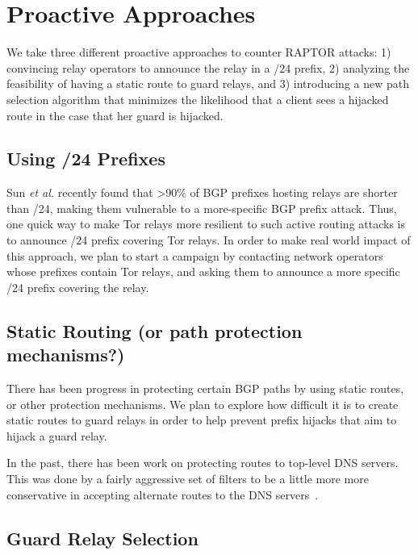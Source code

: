 \section{Proactive Approaches}
We take three different proactive approaches to counter RAPTOR attacks: 1) convincing relay operators to announce the relay in a /24 prefix, 2) analyzing the feasibility of having a static route to guard relays, and 3) introducing a new path selection algorithm that minimizes the likelihood that a client sees a hijacked route in the case that her guard is hijacked.

\subsection{Using /24 Prefixes}

Sun \emph{et al.} \cite{sun2015raptor} recently found that >90\% of BGP prefixes hosting relays are
shorter than /24, making them vulnerable to a more-specific BGP prefix attack. Thus, one quick way to make Tor relays more resilient to such active routing attacks is to announce /24 prefix covering Tor relays. In order to make real world impact of this approach, we plan to start a campaign by contacting network operators whose prefixes contain Tor relays, and asking them to announce a more specific /24 prefix covering the relay. 

\subsection{Static Routing (or path protection mechanisms?)}

There has been progress in protecting certain BGP paths by using static routes, or other protection mechanisms.  We plan to explore how difficult it is to create static routes to guard relays in order to help prevent prefix hijacks that aim to hijack a guard relay.  

In the past, there has been work on protecting routes to top-level DNS servers.  This was done by a fairly aggressive set of filters to be a little more more conservative in accepting alternate routes to the DNS servers~\cite{staticroute}.

\subsection{Guard Relay Selection}

